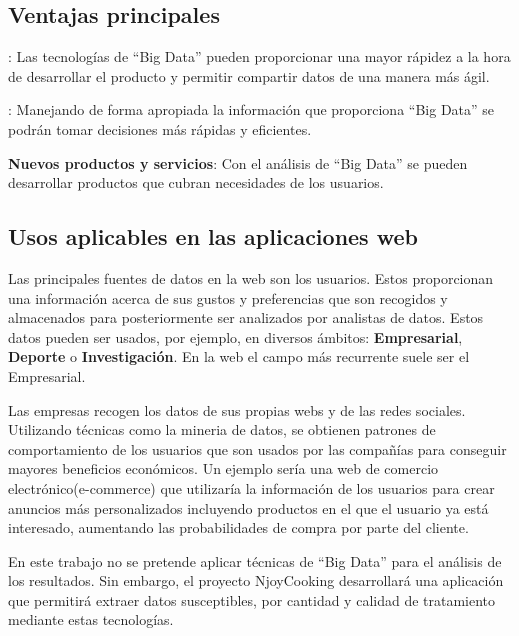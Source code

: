 \subsection{Ventajas principales}


\begin{description}
  \item [Reducción de costes]: Las tecnologías de ``Big Data'' pueden proporcionar una mayor rápidez a la hora de desarrollar el producto y permitir compartir datos de una manera más ágil.
  \item [Toma de decisiones rápida]: Manejando de forma apropiada la información que proporciona ``Big Data'' se podrán tomar
  decisiones más rápidas y eficientes.
  \item \textbf{Nuevos productos y servicios}: Con el análisis de ``Big Data'' se pueden desarrollar productos que cubran necesidades de los usuarios.
\end{description}

\subsection{Usos aplicables en las aplicaciones web}

Las principales fuentes de datos en la web son los usuarios. Estos proporcionan una información acerca de sus gustos y preferencias que son
recogidos y almacenados para posteriormente ser analizados por analistas de datos. Estos datos pueden ser usados, por ejemplo, en diversos ámbitos: \textbf{Empresarial}, \textbf{Deporte} o \textbf{Investigación}. En la web el campo más recurrente suele ser el Empresarial.

\vspace{5 mm}

Las empresas recogen los datos de sus propias webs y de las redes sociales. Utilizando técnicas como la mineria de datos, se obtienen patrones de comportamiento de los usuarios que son usados por las compañías para conseguir mayores beneficios económicos. Un ejemplo sería una web de comercio electrónico(e-commerce) que utilizaría la información de los usuarios para crear anuncios más personalizados incluyendo productos en el que el usuario ya está interesado, aumentando las probabilidades de compra por parte del cliente.

En este trabajo no se pretende aplicar técnicas de ``Big Data'' para el análisis de los resultados. Sin embargo, el proyecto NjoyCooking desarrollará una aplicación que permitirá extraer datos susceptibles, por cantidad y calidad de tratamiento mediante estas tecnologías.

